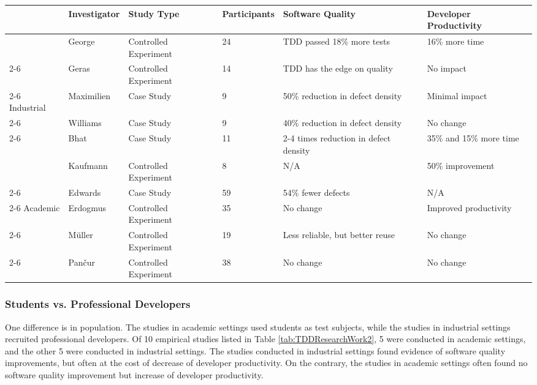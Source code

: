 \begin{sidewaystable}[htbp]
\centering
  \begin{tabular}{|l|l|l|l|l|l|} \hline 
 & Investigator	& Study Type & Participants	& Software Quality	& Developer Productivity \\ \hline
 & George \cite{George:03} & Controlled Experiment	& 24	& TDD passed 18\% more tests & 16\% more time \\ \cline{2-6}
 & Geras \cite{Geras:04}  &  Controlled Experiment & 14	& TDD has the edge on quality & No impact \\ \cline{2-6}
 Industrial
 & Maximilien	\cite{Maximilien:03} & Case Study &  9	& 50\% reduction in defect density	& Minimal impact \\ \cline{2-6}
 & Williams\cite{Williams:03} & Case Study & 9	& 40\% reduction in defect density	& No change \\ \cline{2-6}
 & Bhat	\cite{Bhat:06}  & Case Study & 11	& 2-4 times reduction in defect density	& 35\% and 15\% more time \\ 
 
 \hline \hline
 
         & Kaufmann \cite{Kaufmann:03}	& Controlled Experiment &  8	& N/A	    & 50\% improvement \\ \cline{2-6}
         & Edwards \cite{Edwards:04} & Case Study & 59	& 54\% fewer defects	& N/A \\ \cline{2-6}
Academic & Erdogmus	\cite{Erdogmus:05} & Controlled Experiment & 35	& No change	  & Improved productivity \\ \cline{2-6}
         & M\"{u}ller \cite{Muller:02} & Controlled Experiment & 19 & Less reliable, but better reuse	& No change \\ \cline{2-6}
         & Pan\v{c}ur	\cite{Matjaz:03} & Controlled Experiment & 38	& No change	  & No change \\ \hline
  \end{tabular}
  \caption{Research Work of TDD on Software Quality and Developer Productivity}
  \label{tab:TDDResearchWork2}
\end{sidewaystable}


\subsubsection{Students vs. Professional Developers}
One difference is in population. The studies in academic settings 
used students as test subjects, while the studies in industrial 
settings recruited professional developers. 
Of 10 empirical studies listed in Table \ref{tab:TDDResearchWork2},
5 were conducted in academic settings, and the other 5 were 
conducted in industrial settings. The 
studies conducted in industrial settings found evidence of 
software quality improvements, but often at the cost of 
decrease of developer productivity. On the contrary, the 
studies in academic settings often found no software quality 
improvement but increase of developer productivity. 

